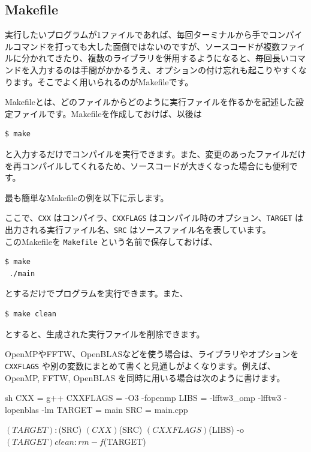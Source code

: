 \documentclass[12pt]{jreport}
\begin{document}
\subsection{Makefile}
実行したいプログラムが1ファイルであれば、毎回ターミナルから手でコンパイルコマンドを打っても大した面倒ではないのですが、ソースコードが複数ファイルに分かれてきたり、複数のライブラリを併用するようになると、毎回長いコマンドを入力するのは手間がかかるうえ、オプションの付け忘れも起こりやすくなります。そこでよく用いられるのがMakefileです。

Makefileとは、どのファイルからどのように実行ファイルを作るかを記述した設定ファイルです。Makefileを作成しておけば、以後は
\begin{lstlisting}[style=terminal]
$ make
\end{lstlisting}
と入力するだけでコンパイルを実行できます。また、変更のあったファイルだけを再コンパイルしてくれるため、ソースコードが大きくなった場合にも便利です。

最も簡単なMakefileの例を以下に示します。


ここで、\texttt{CXX} はコンパイラ、\texttt{CXXFLAGS} はコンパイル時のオプション、\texttt{TARGET} は出力される実行ファイル名、\texttt{SRC} はソースファイル名を表しています。\\
このMakefileを \texttt{Makefile} という名前で保存しておけば、

\begin{lstlisting}[style=terminal]
$ make
 ./main
\end{lstlisting}
とするだけでプログラムを実行できます。また、

\begin{lstlisting}[style=terminal]
$ make clean
\end{lstlisting}
とすると、生成された実行ファイルを削除できます。

OpenMPやFFTW、OpenBLASなどを使う場合は、ライブラリやオプションを \texttt{CXXFLAGS} や別の変数にまとめて書くと見通しがよくなります。例えば、OpenMP, FFTW, OpenBLAS を同時に用いる場合は次のように書けます。

\begin{codebox}[Makefile]{sh}
CXX = g++
CXXFLAGS = -O3 -fopenmp
LIBS = -lfftw3_omp -lfftw3 -lopenblas -lm
TARGET = main
SRC = main.cpp

$(TARGET): $(SRC)
	$(CXX) $(SRC) $(CXXFLAGS) $(LIBS) -o $(TARGET)

clean:
	rm -f $(TARGET)
\end{codebox}
\end{document}
